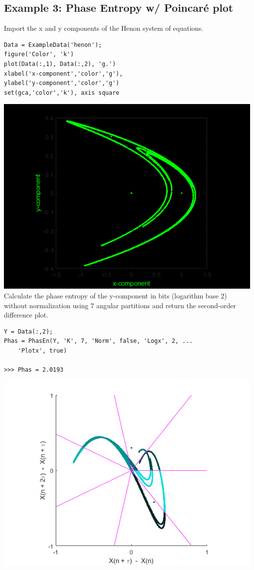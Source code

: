 \documentclass[12pt, a4paper, titlepage, openany]{book}
\begin{document}
\subsection{\normalsize Example 3: \hspace{15mm} Phase Entropy w/ Poincaré plot}
\noindent Import the x and y components of the Henon system of equations.
\begin{verbatim}
Data = ExampleData('henon');
figure('Color', 'k')
plot(Data(:,1), Data(:,2), 'g.')
xlabel('x-component','color','g'), 
ylabel('y-component','color','g')
set(gca,'color','k'), axis square
\end{verbatim}
\includegraphics[scale=.5]{henon.png}\newline \newline
Calculate the phase entropy of the y-component in bits (logarithm base 2) without normalization using 7 angular partitions and return the second-order difference plot.
\begin{verbatim}
Y = Data(:,2);
Phas = PhasEn(Y, 'K', 7, 'Norm', false, 'Logx', 2, ...
	'Plotx', true)

>>> Phas = 2.0193
\end{verbatim}
\includegraphics[scale=.65]{phasex1.png}\newline \newline
\end{document}
